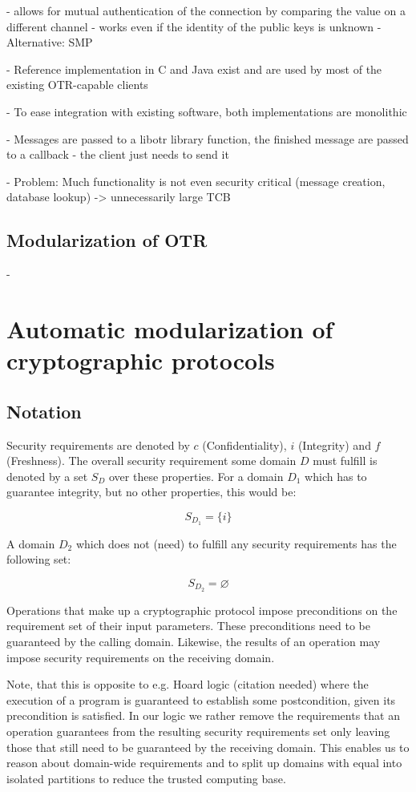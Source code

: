 \documentclass[a4paper]{article}
\newcommand{\emptysec}{\varnothing}
\begin{document}
        - allows for mutual authentication of the connection by comparing the value on a different channel
        - works even if the identity of the public keys is unknown
        - Alternative: SMP

- Reference implementation in C and Java exist and are used by most of the existing OTR-capable clients

- To ease integration with existing software, both implementations are monolithic

- Messages are passed to a libotr library function, the finished message are passed to a callback - the client just needs to send it

- Problem: Much functionality is not even security critical (message creation, database lookup) -> unnecessarily large TCB


\subsection{Modularization of OTR}

- 

\section{\label{sec:automatic_modularization}Automatic modularization of cryptographic protocols}

\subsection{Notation}

Security requirements are denoted by $c$ (Confidentiality), $i$ (Integrity) and
$f$ (Freshness). The overall security requirement some domain $D$ must fulfill
is denoted by a set $S_D$ over these properties. For a domain $D_1$ which has
to guarantee integrity, but no other properties, this would be:

$$S_{D_1} = \{i\}$$

A domain $D_2$ which does not (need) to fulfill any security requirements has
the following set:

$$S_{D_2} = \emptysec$$

Operations that make up a cryptographic protocol impose preconditions on the
requirement set of their input parameters. These preconditions need to be
guaranteed by the calling domain. Likewise, the results of an operation may
impose security requirements on the receiving domain.

Note, that this is opposite to e.g. Hoard logic (citation needed) where the
execution of a program is guaranteed to establish some postcondition, given its
precondition is satisfied. In our logic we rather remove the requirements that
an operation guarantees from the resulting security requirements set only
leaving those that still need to be guaranteed by the receiving domain. This
enables us to reason about domain-wide requirements and to split up domains
with equal into isolated partitions to reduce the trusted computing base.
\end{document}
